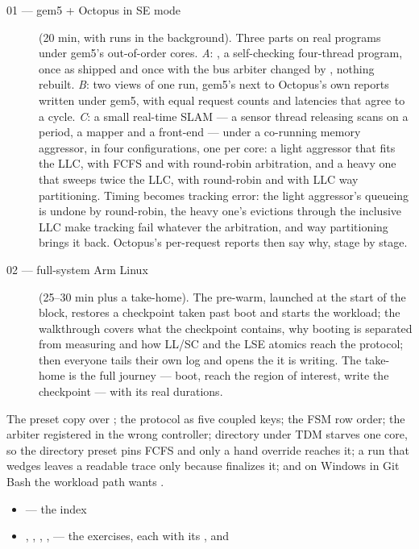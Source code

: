 \begin{description}
\item[01 --- gem5 + Octopus in SE mode] (20 min, with runs in the background). Three parts
  on real programs under gem5's out-of-order cores. \emph{A}: , a self-checking
  four-thread program, once as shipped and once with the bus arbiter changed by
  , nothing rebuilt. \emph{B}: two views of one run, gem5's
   next to Octopus's own  reports written under gem5, with
  equal request counts and latencies that agree to a cycle. \emph{C}: a small real-time SLAM
  --- a sensor thread releasing scans on a period, a mapper and a front-end --- under a
  co-running memory aggressor, in four configurations, one per core: a light aggressor that
  fits the LLC, with FCFS and with round-robin arbitration, and a heavy one that sweeps twice
  the LLC, with round-robin and with LLC way partitioning. Timing becomes tracking error: the
  light aggressor's queueing is undone by round-robin, the heavy one's evictions through the
  inclusive LLC make tracking fail whatever the arbitration, and way partitioning brings it
  back. Octopus's per-request reports then say why, stage by stage.
\item[02 --- full-system Arm Linux] (25--30 min plus a take-home). The pre-warm, launched at the
  start of the block, restores a checkpoint taken past boot and starts the workload; the
  walkthrough covers what the checkpoint contains, why booting is separated from measuring and
  how LL/SC and the LSE atomics reach the protocol; then everyone tails their own log and opens
  the  it is writing. The take-home is the full journey --- boot, reach the
  region of interest, write the checkpoint --- with its real durations.
\end{description}

\begin{trapbox}
The preset copy over ; the protocol as five coupled keys; the FSM row
order; the arbiter registered in the wrong controller; directory under TDM starves one core, so
the directory preset pins FCFS and only a hand override reaches it; a run that wedges leaves a
readable trace only because  finalizes it; and on Windows in Git Bash
the workload path wants .
\end{trapbox}

\begin{wherebox}
\begin{itemize}[nosep,leftmargin=1.2em]
\item {} --- the index
\item {}, , , ,  --- the exercises, each with its ,  and 
\end{itemize}
\end{wherebox}
